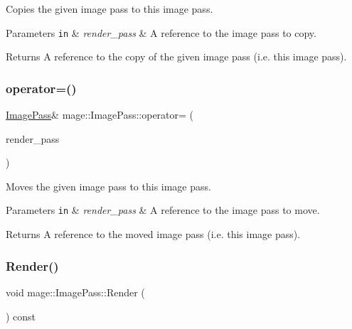 Copies the given image pass to this image pass.


\begin{DoxyParams}[1]{Parameters}
\mbox{\tt in}  & {\em render\+\_\+pass} & A reference to the image pass to copy. \\
\hline
\end{DoxyParams}
\begin{DoxyReturn}{Returns}
A reference to the copy of the given image pass (i.\+e. this image pass). 
\end{DoxyReturn}
\hypertarget{classmage_1_1_image_pass_adb56246449b95b8f9cbbbb118caa30c3}{}\label{classmage_1_1_image_pass_adb56246449b95b8f9cbbbb118caa30c3} 
\subsubsection{\texorpdfstring{operator=()}{operator=()}\hspace{0.1cm}{\footnotesize\ttfamily [2/2]}}
{\footnotesize\ttfamily \hyperlink{classmage_1_1_image_pass}{Image\+Pass}\& mage\+::\+Image\+Pass\+::operator= (\begin{DoxyParamCaption}\item[{\hyperlink{classmage_1_1_image_pass}{Image\+Pass} \&\&}]{render\+\_\+pass }\end{DoxyParamCaption})\hspace{0.3cm}{\ttfamily [delete]}}

Moves the given image pass to this image pass.


\begin{DoxyParams}[1]{Parameters}
\mbox{\tt in}  & {\em render\+\_\+pass} & A reference to the image pass to move. \\
\hline
\end{DoxyParams}
\begin{DoxyReturn}{Returns}
A reference to the moved image pass (i.\+e. this image pass). 
\end{DoxyReturn}
\hypertarget{classmage_1_1_image_pass_ae244ceb2ba0af61cb5814c2775d4e303}{}\label{classmage_1_1_image_pass_ae244ceb2ba0af61cb5814c2775d4e303} 
\subsubsection{\texorpdfstring{Render()}{Render()}}
{\footnotesize\ttfamily void mage\+::\+Image\+Pass\+::\+Render (\begin{DoxyParamCaption}{ }\end{DoxyParamCaption}) const\hspace{0.3cm}{\ttfamily [noexcept]}}

